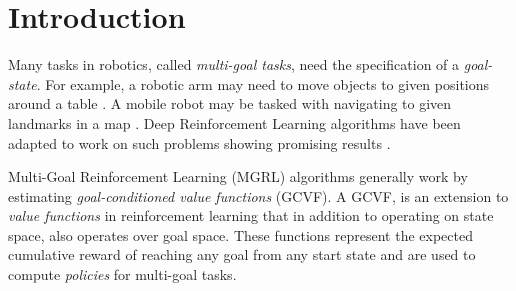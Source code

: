 
\section{Introduction}

Many tasks in robotics, called \emph{multi-goal tasks},  need the
specification of a \emph{goal-state}.  For example, a robotic arm may
need to move objects to given positions around a table
\citep{gu2017deep}. A mobile robot may be tasked with navigating to
given landmarks in a map \citep{zhu2017target}.  Deep
Reinforcement Learning algorithms have been adapted to work on such
problems showing promising results \citep{andrychowicz2017hindsight,pong2018temporal}. 

Multi-Goal Reinforcement Learning (MGRL) \citep{plappert2018multi}
algorithms generally work by estimating \emph{goal-conditioned value
functions} (GCVF). A GCVF, is an extension to \emph{value functions} in
reinforcement learning that in addition to operating on state space,
also operates over goal space.  These functions represent the expected
cumulative reward of reaching any goal from any start state and are used
to compute \emph{policies} for multi-goal tasks. 


